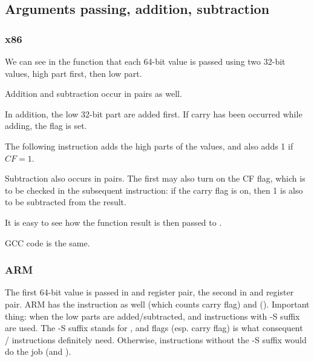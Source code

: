 ﻿\subsection{Arguments passing, addition, subtraction}



\subsubsection{x86}



We can see in the  function that each 64-bit value is passed using two 32-bit values,
high part first, then low part. 

Addition and subtraction occur in pairs as well.

In addition, the low 32-bit part are added first.
If carry has been occurred while adding, the  flag is set.

The following  instruction adds the high parts of the values, and also adds 1 if $CF=1$.

Subtraction also occurs in pairs.
The first \SUB may also turn on the CF flag, which is to be checked in the subsequent  instruction:
if the carry flag is on, then 1 is also to be subtracted from the result.

It is easy to see how the  function result is then passed to \printf{}.



GCC code is the same.

\subsubsection{ARM}




The first 64-bit value is passed in  and  register pair, the second in  and  register pair.
ARM has the  instruction as well (which counts carry flag) and  ().
Important thing: when the low parts are added/subtracted,  and  instructions with -S suffix are used.
The -S suffix stands for , and flags (esp. carry flag) is what consequent / instructions definitely need.
Otherwise, instructions without the -S suffix would do the job (\ADD and \SUB).


